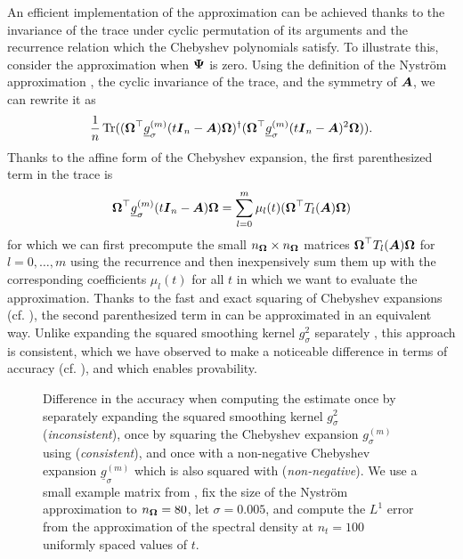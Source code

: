 \documentclass[12pt]{article}
\begin{document}
An efficient implementation of the approximation  can be achieved thanks to the invariance of the trace under cyclic permutation of its arguments and the recurrence relation  which the Chebyshev polynomials satisfy. To illustrate this, consider the approximation  when $\boldsymbol{\Psi}$ is zero. Using the definition of the Nyström approximation , the cyclic invariance of the trace, and the symmetry of $\boldsymbol{A}$, we can rewrite it as
\begin{equation}
    \frac{1}{n} \operatorname{Tr}((\boldsymbol{\Omega}^{\top} \underline{g}^{(m)}_{\sigma}(t \boldsymbol{I}_n - \boldsymbol{A}) \boldsymbol{\Omega})^{\dagger} (\boldsymbol{\Omega}^{\top} \underline{g}^{(m)}_{\sigma}(t \boldsymbol{I}_n - \boldsymbol{A})^2 \boldsymbol{\Omega})).
    \label{equ:cyclic-property}
\end{equation}
Thanks to the affine form of the Chebyshev expansion, the first parenthesized term in the trace is
\begin{equation}
    \boldsymbol{\Omega}^{\top} \underline{g}^{(m)}_{\sigma}(t \boldsymbol{I}_n - \boldsymbol{A}) \boldsymbol{\Omega} = \sum_{l=0}^{m} \mu_l(t) (\boldsymbol{\Omega}^{\top} T_l(\boldsymbol{A}) \boldsymbol{\Omega})
\end{equation}
for which we can first precompute the small $n_{\boldsymbol{\Omega}} \times n_{\boldsymbol{\Omega}}$ matrices $\boldsymbol{\Omega}^{\top} T_l(\boldsymbol{A}) \boldsymbol{\Omega}$ for $l=0, \dots, m$ using the recurrence  and then inexpensively sum them up with the corresponding coefficients $\mu_l(t)$ for all $t$ in which we want to evaluate the approximation. Thanks to the fast and exact squaring of Chebyshev expansions (cf. ), the second parenthesized term in  can be approximated in an equivalent way. Unlike expanding the squared smoothing kernel $g_{\sigma}^2$ separately \cite{lin-2017-randomized-estimation}, this approach is consistent, which we have observed to make a noticeable difference in terms of accuracy (cf. ), and which enables provability. 

\begin{figure}[ht]
    \centering
    
    \caption{Difference in the accuracy when computing the estimate  once by separately expanding the squared smoothing kernel $g_{\sigma}^2$ (\emph{inconsistent}), once by squaring the Chebyshev expansion $g_{\sigma}^{(m)}$ using  (\emph{consistent}), and once with a non-negative Chebyshev expansion $\underline{g}_{\sigma}^{(m)}$  which is also squared with  (\emph{non-negative}). We use a small example matrix from , fix the size of the Nyström approximation to $n_{\boldsymbol{\Omega}} = 80$, let $\sigma = 0.005$, and compute the $L^1$ error from the approximation of the spectral density at $n_t = 100$ uniformly spaced values of $t$.}
    \label{fig:interpolation-issue}
\end{figure}
\end{document}
